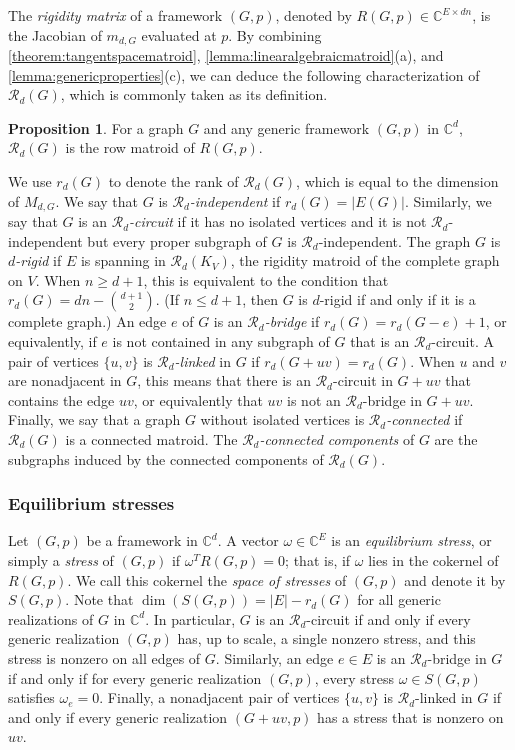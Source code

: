 \documentclass[11pt,a4paper,dvipsnames]{scrartcl}
\theoremstyle{definition}
\newtheorem{proposition}[theorem]{Proposition}
\newcommand{\CC}{\mathbb{C}}
\newcommand{\rig}[1]{$#1$-rigid}
\begin{document}
The \emph{rigidity matrix} of a framework $(G,p)$, denoted by $R(G,p) \in \CC^{E \times dn}$, is the Jacobian of $m_{d,G}$ evaluated at $p$. By combining \cref{theorem:tangentspacematroid}, \cref{lemma:linearalgebraicmatroid}(a), and \cref{lemma:genericproperties}(c), we can deduce the following characterization of $\mathcal{R}_d(G)$, which is commonly taken as its definition.
\begin{proposition}
    For a graph $G$ and any generic framework $(G,p)$ in $\CC^d$, $\mathcal{R}_d(G)$ is the row matroid of $R(G,p)$.
\end{proposition}

We use $r_d(G)$ to denote the rank of $\mathcal{R}_d(G)$, which is equal to the dimension of $M_{d,G}$. We say that $G$ is \emph{$\mathcal{R}_d$-independent} if $r_d(G) = |E(G)|$. Similarly, we say that $G$ is an \emph{$\mathcal{R}_d$-circuit} if it has no isolated vertices and it is not $\mathcal{R}_d$-independent but every proper subgraph of $G$ is $\mathcal{R}_d$-independent. The graph $G$ is \emph{\rig{d}} if $E$ is spanning in $\mathcal{R}_d(K_V)$, the rigidity matroid of the complete graph on $V$. When $n \geq d+1$, this is equivalent to the condition that $r_d(G) = dn - \binom{d+1}{2}$. (If $n \leq d+1$, then $G$ is \rig{d} if and only if it is a complete graph.) An edge $e$ of $G$ is an \emph{$\mathcal{R}_d$-bridge} if $r_d(G) = r_d(G-e) + 1$, or equivalently, if $e$ is not contained in any subgraph of $G$ that is an $\mathcal{R}_d$-circuit. A pair of vertices $\{u,v\}$ is \emph{$\mathcal{R}_d$-linked} in $G$ if $r_d(G + uv) = r_d(G)$. When $u$ and $v$ are nonadjacent in $G$, this means that there is an $\mathcal{R}_d$-circuit in $G+uv$ that contains the edge $uv$, or equivalently that $uv$ is not an $\mathcal{R}_d$-bridge in $G+uv$. Finally, we say that a graph $G$ without isolated vertices is \emph{$\mathcal{R}_d$-connected} if $\mathcal{R}_d(G)$ is a connected matroid. The \emph{$\mathcal{R}_d$-connected components} of $G$ are the subgraphs induced by the connected components of $\mathcal{R}_d(G)$.

\subsubsection{Equilibrium stresses}

Let $(G,p)$ be a framework in $\CC^d$. A vector $\omega \in \CC^E$ is an \emph{equilibrium stress}, or simply a \emph{stress} of $(G,p)$ if $\omega^T R(G,p) = 0$; that is, if $\omega$ lies in the cokernel of $R(G,p)$. We call this cokernel the \emph{space of stresses} of $(G,p)$ and denote it by $S(G,p)$. Note that $\dim(S(G,p)) = |E| - r_d(G)$ for all generic realizations of $G$ in $\CC^d$. In particular, $G$ is an $\mathcal{R}_d$-circuit if and only if every generic realization $(G,p)$ has, up to scale, a single nonzero stress, and this stress is nonzero on all edges of $G$. Similarly, an edge $e \in E$ is an $\mathcal{R}_d$-bridge in $G$ if and only if for every generic realization $(G,p)$, every stress $\omega \in S(G,p)$ satisfies $\omega_e=0$. Finally, a nonadjacent pair of vertices $\{u,v\}$ is $\mathcal{R}_d$-linked in $G$ if and only if every generic realization $(G+uv,p)$ has a stress that is nonzero on $uv$.
\end{document}

